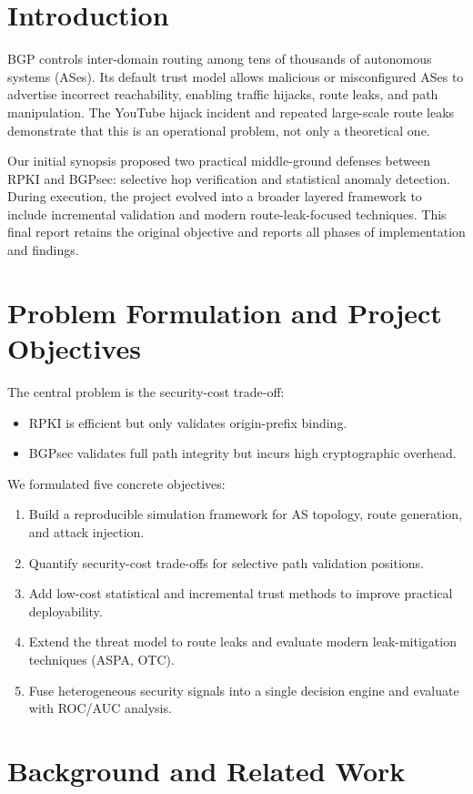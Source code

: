 \documentclass[conference]{IEEEtran}
\begin{document}
\section{Introduction}
BGP controls inter-domain routing among tens of thousands of autonomous systems (ASes). Its default trust model allows malicious or misconfigured ASes to advertise incorrect reachability, enabling traffic hijacks, route leaks, and path manipulation. The YouTube hijack incident and repeated large-scale route leaks demonstrate that this is an operational problem, not only a theoretical one.

Our initial synopsis proposed two practical middle-ground defenses between RPKI and BGPsec: selective hop verification and statistical anomaly detection. During execution, the project evolved into a broader layered framework to include incremental validation and modern route-leak-focused techniques. This final report retains the original objective and reports all phases of implementation and findings.

\section{Problem Formulation and Project Objectives}
The central problem is the security-cost trade-off:
\begin{itemize}
\item RPKI is efficient but only validates origin-prefix binding.
\item BGPsec validates full path integrity but incurs high cryptographic overhead.
\end{itemize}

We formulated five concrete objectives:
\begin{enumerate}
\item Build a reproducible simulation framework for AS topology, route generation, and attack injection.
\item Quantify security-cost trade-offs for selective path validation positions.
\item Add low-cost statistical and incremental trust methods to improve practical deployability.
\item Extend the threat model to route leaks and evaluate modern leak-mitigation techniques (ASPA, OTC).
\item Fuse heterogeneous security signals into a single decision engine and evaluate with ROC/AUC analysis.
\end{enumerate}

\section{Background and Related Work}
\end{document}
